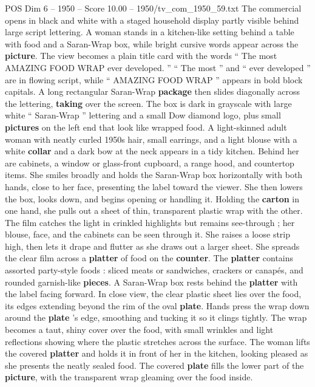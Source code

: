 \begin{textsample}{POS Dim 6 – 1950 – Score 10.00 – 1950/tv\_com\_1950\_59.txt}  \label{ex:f6_pos_020}
The commercial opens in black and white with a staged household display partly visible behind large script lettering.
A woman stands in a kitchen-like setting behind a table with food and a Saran-Wrap box, while bright cursive words appear across the \textbf{picture}.
The view becomes a plain title card with the words “ The most AMAZING FOOD WRAP ever developed. ” “ The most ” and “ ever developed ” are in flowing script, while “ AMAZING FOOD WRAP ” appears in bold block capitals.
A long rectangular Saran-Wrap \textbf{package} then slides diagonally across the lettering, \textbf{taking} over the screen.
The box is dark in grayscale with large white “ Saran-Wrap ” lettering and a small Dow diamond logo, plus small \textbf{pictures} on the left end that look like wrapped food.
A light-skinned adult woman with neatly curled 1950s hair, small earrings, and a light blouse with a white \textbf{collar} and a dark bow at the neck appears in a tidy kitchen.
Behind her are cabinets, a window or glass-front cupboard, a range hood, and countertop items.
She smiles broadly and holds the Saran-Wrap box horizontally with both hands, close to her face, presenting the label toward the viewer.
She then lowers the box, looks down, and begins opening or handling it.
Holding the \textbf{carton} in one hand, she pulls out a sheet of thin, transparent plastic wrap with the other.
The film catches the light in crinkled highlights but remains see-through ; her blouse, face, and the cabinets can be seen through it.
She raises a loose strip high, then lets it drape and flutter as she draws out a larger sheet.
She spreads the clear film across a \textbf{platter} of food on the \textbf{counter}.
The \textbf{platter} contains assorted party-style foods : sliced meats or sandwiches, crackers or canapés, and rounded garnish-like \textbf{pieces}.
A Saran-Wrap box rests behind the \textbf{platter} with the label facing forward.
In close view, the clear plastic sheet lies over the food, its edges extending beyond the rim of the oval \textbf{plate}.
Hands press the wrap down around the \textbf{plate} ’s edge, smoothing and tucking it so it clings tightly.
The wrap becomes a taut, shiny cover over the food, with small wrinkles and light reflections showing where the plastic stretches across the surface.
The woman lifts the covered \textbf{platter} and holds it in front of her in the kitchen, looking pleased as she presents the neatly sealed food.
The covered \textbf{plate} fills the lower part of the \textbf{picture}, with the transparent wrap gleaming over the food inside.

\end{textsample}
